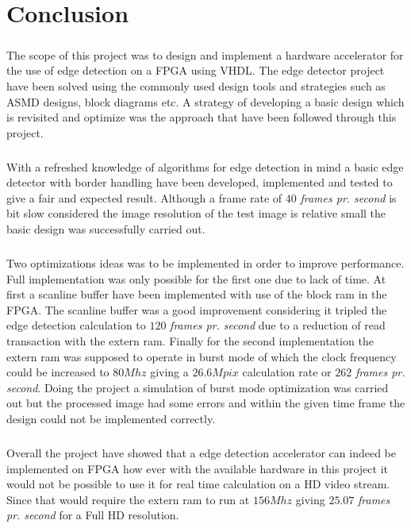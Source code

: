 \chapter{Conclusion}
\paragraph*{ }
The scope of this project was to design and implement a hardware accelerator for the use of edge detection on a FPGA using VHDL. The edge detector project have been solved using the commonly used design tools and strategies such as ASMD designs, block diagrams etc. A strategy of developing a basic design which is revisited and optimize was the approach that have been followed through this project.
\paragraph*{ }
With a refreshed knowledge of algorithms for edge detection in mind a basic edge detector with border handling have been developed, implemented and tested to give a fair and expected result. Although a frame rate of $40$ \textit{frames pr. second} is bit slow considered the image resolution of the test image is relative small the basic design was successfully carried out.
\paragraph*{ }
Two optimizations ideas was to be implemented in order to improve performance. Full implementation was only possible for the first one due to lack of time. At first a scanline buffer have been implemented with use of the block ram in the FPGA. The scanline buffer was a good improvement considering it tripled the edge detection calculation to $120$ \textit{frames pr. second} due to a reduction of read transaction with the extern ram. Finally for the second implementation the extern ram was supposed to operate in burst mode of which the clock frequency could be increased to $80Mhz$ giving a $26.6Mpix$ calculation rate or $262$ \textit{frames pr. second}. Doing the project a simulation of burst mode optimization was carried out but the processed image had some errors and within the given time frame the design could not be implemented correctly.
\paragraph*{ }
 Overall the project have showed that a edge detection accelerator can indeed be implemented on FPGA how ever with the available hardware in this project it would not be possible to use it for real time calculation on a HD video stream. Since that would require the extern ram to run at $156Mhz$ giving $25.07$ \textit{frames pr. second} for a Full HD resolution.

\newpage